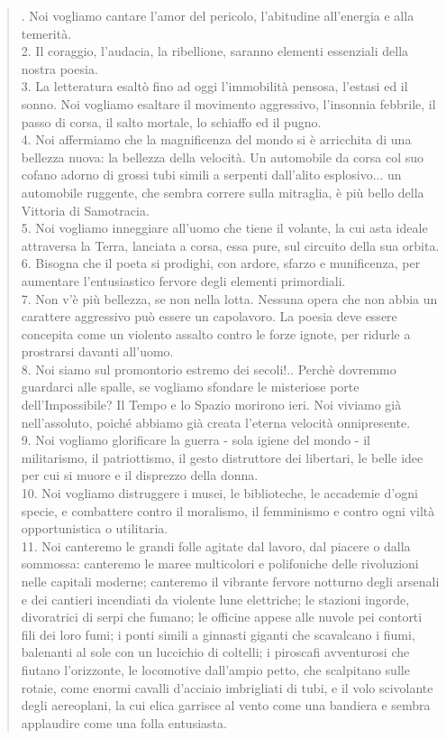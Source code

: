 \documentclass[a4paper, twoside, titlepage]{book}
\newcounter{mar}
\newcommand{\citazione}[1]{%
  \begin{quotation}
  \begin{linenumbers}
  \modulolinenumbers[5]
  \begingroup
  \setlength{\parindent}{0cm}
  \noindent #1
  \endgroup
  \end{linenumbers}
  \end{quotation}\setcounter{linenumber}{1}
  }
\begin{document}
\citazione{1. Noi vogliamo cantare l'amor del pericolo, l'abitudine all'energia e alla temerità.\\
2. Il coraggio, l'audacia, la ribellione, saranno elementi essenziali della nostra poesia.\\
3. La letteratura esaltò fino ad oggi l'immobilità pensosa, l'estasi ed il sonno. Noi vogliamo esaltare il movimento aggressivo, l'insonnia febbrile, il passo di corsa, il salto mortale, lo schiaffo ed il pugno.\\
4. Noi affermiamo che la magnificenza del mondo si è arricchita di una bellezza nuova: la bellezza della velocità. Un automobile da corsa col suo cofano adorno di grossi tubi simili a serpenti dall'alito esplosivo... un automobile ruggente, che sembra correre sulla mitraglia, è più bello della Vittoria di Samotracia.\\
5. Noi vogliamo inneggiare all'uomo che tiene il volante, la cui asta ideale attraversa la Terra, lanciata a corsa, essa pure, sul circuito della sua orbita.\\
6. Bisogna che il poeta si prodighi, con ardore, sfarzo e munificenza, per aumentare l'entusiastico fervore degli elementi primordiali.\\
7. Non v'è più bellezza, se non nella lotta. Nessuna opera che non abbia un carattere aggressivo può essere un capolavoro. La poesia deve essere concepita come un violento assalto contro le forze ignote, per ridurle a prostrarsi davanti all'uomo.\\
8. Noi siamo sul promontorio estremo dei secoli!.. Perchè dovremmo guardarci alle spalle, se vogliamo sfondare le misteriose porte dell'Impossibile? Il Tempo e lo Spazio morirono ieri. Noi viviamo già nell'assoluto, poiché abbiamo già creata l'eterna velocità onnipresente.\\
9. Noi vogliamo glorificare la guerra - sola igiene del mondo - il militarismo, il patriottismo, il gesto distruttore dei libertari, le belle idee per cui si muore e il disprezzo della donna.\\
10. Noi vogliamo distruggere i musei, le biblioteche, le accademie d'ogni specie, e combattere contro il moralismo, il femminismo e contro ogni viltà opportunistica o utilitaria.\\
11. Noi canteremo le grandi folle agitate dal lavoro, dal piacere o dalla sommossa: canteremo le maree multicolori e polifoniche delle rivoluzioni nelle capitali moderne; canteremo il vibrante fervore notturno degli arsenali e dei cantieri incendiati da violente lune elettriche; le stazioni ingorde, divoratrici di serpi che fumano; le officine appese alle nuvole pei contorti fili dei loro fumi; i ponti simili a ginnasti giganti che scavalcano i fiumi, balenanti al sole con un luccichio di coltelli; i piroscafi avventurosi che fiutano l'orizzonte, le locomotive dall'ampio petto, che scalpitano sulle rotaie, come enormi cavalli d'acciaio imbrigliati di tubi, e il volo scivolante degli aereoplani, la cui elica garrisce al vento come una bandiera e sembra applaudire come una folla entusiasta.\\
}
\end{document}
